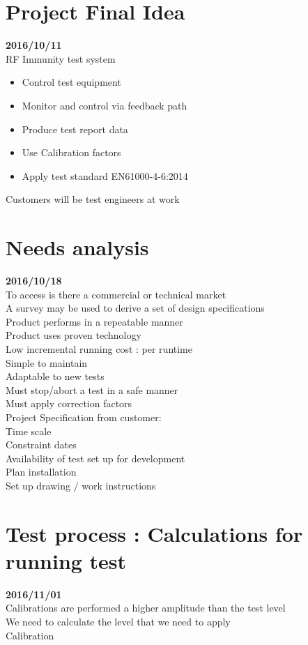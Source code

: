 \section{Project Final Idea}\textbf{2016/10/11}\\
RF Immunity test system\\
\begin{itemize}
  \item Control test equipment
  \item Monitor and control via feedback path
  \item Produce test report data
  \item Use Calibration factors
  \item Apply test standard \gls{EN61000-4-6:2014}
\end{itemize}
Customers will be test engineers at work\\


\section{Needs analysis}\textbf{2016/10/18}\\
To access is there a commercial or technical market\\
A survey may be used to derive a set of design specifications\\
Product performs in a repeatable manner\\
Product uses proven technology\\
Low incremental running cost : per runtime\\
Simple to maintain\\
Adaptable to new tests\\
Must stop/abort a test in a safe manner\\
Must apply correction factors\\

Project Specification from customer:\\
Time scale\\
Constraint dates\\
Availability of test set up for development\\
Plan installation\\
Set up drawing / work instructions\\


\section{Test process : Calculations for running test}\textbf{2016/11/01}\\
Calibrations are performed a higher amplitude than the test level\\
We need to calculate the level that we need to apply\\
Calibration\\

